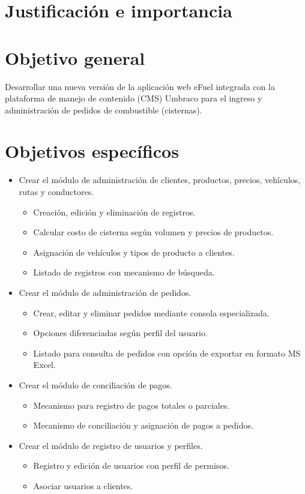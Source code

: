 \section*{Justificación e importancia}


\section*{Objetivo general}
Desarrollar una nueva versión de la aplicación web eFuel integrada con la plataforma de manejo de contenido (CMS) Umbraco para el ingreso y administración de pedidos de combustible (cisternas).

\section*{Objetivos específicos}
\begin{itemize}
    \item Crear el módulo de administración de clientes, productos, precios, vehículos, rutas y conductores.
    \begin{itemize}
        \item Creación, edición y eliminación de registros.
        \item Calcular costo de cisterna según volumen y precios de productos.
        \item Asignación de vehículos y tipos de producto a clientes.
        \item Listado de registros con mecanismo de búsqueda.
    \end{itemize}

    \item Crear el módulo de administración de pedidos.
    \begin{itemize}
        \item Crear, editar y eliminar pedidos mediante consola especializada.
        \item Opciones diferenciadas según perfil del usuario.
        \item Listado para consulta de pedidos con opción de exportar en formato MS Excel.
    \end{itemize}

    \item Crear el módulo de conciliación de pagos.
    \begin{itemize}
        \item Mecanismo para registro de pagos totales o parciales.
        \item Mecanismo de conciliación y asignación de pagos a pedidos.
    \end{itemize}

    \item Crear el módulo de registro de usuarios y perfiles.
    \begin{itemize}
        \item Registro y edición de usuarios con perfil de permisos.
        \item Asociar usuarios a clientes.
    \end{itemize}
\end{itemize}